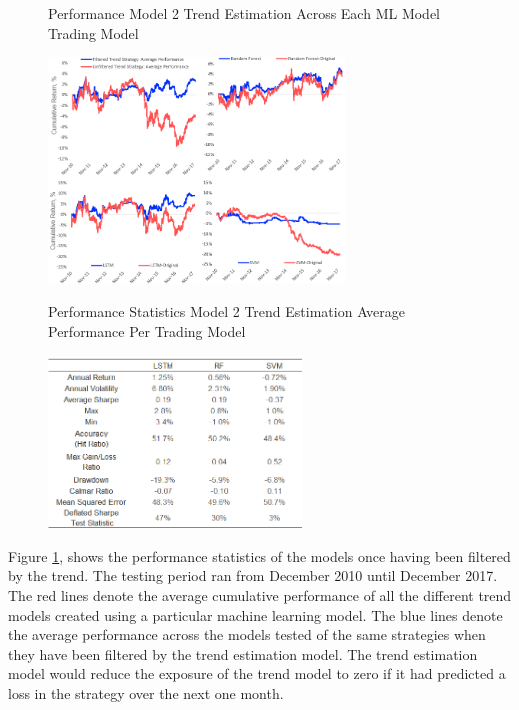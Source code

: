\documentclass[11pt]{article}
\begin{document}
\begin{figure}[h]
    \centering
	\caption{Performance Model 2 Trend Estimation Across Each ML Model Trading Model}    
	\includegraphics[width=0.7\textwidth]{TrendFilteredResults}
    \label{fig:TrendFilteredResults}
     \caption*{}
\end{figure}

\begin{figure}[h]
    \centering
	\caption{Performance Statistics Model 2 Trend Estimation Average Performance Per Trading Model}    
	\includegraphics[width=0.6\textwidth]{TrendEstimationSTATSv3}
    \label{fig:TrendEstimationSTATS}
     \caption*{}
\end{figure}

Figure \ref{fig:TrendFilteredResults}, shows the performance statistics of the models once having been filtered by the trend. The testing period ran from December 2010 until December 2017. The red lines denote the average cumulative performance of all the different trend models created using a particular machine learning model. The blue lines denote the average performance across the models tested of the same strategies when they have been filtered by the trend estimation model. The trend estimation model would reduce the exposure of the trend model to zero if it had predicted a loss in the strategy over the next one month.  
\end{document}
